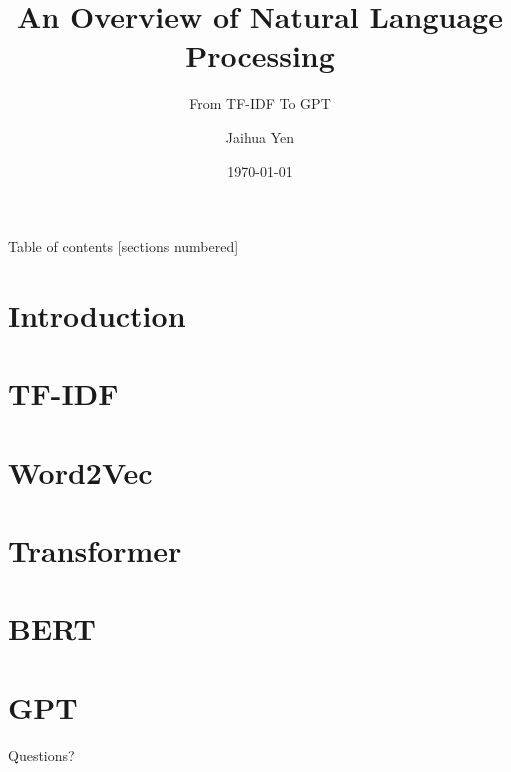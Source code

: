 \documentclass[10pt]{beamer}
\title{An Overview of Natural Language Processing}
\subtitle{From TF-IDF To GPT}
\date{\today}
\author{Jaihua Yen}
\institute{QNAP}
\begin{document}
\maketitle

\begin{frame}{Table of contents}
    [sections numbered]
    \tableofcontents%
\end{frame}

\section{Introduction}



\section{TF-IDF}



\section{Word2Vec}



\section{Transformer}



\section{BERT}



\section{GPT}



\appendix


\begin{frame}[standout]
    Questions?
\end{frame}


\end{document}
